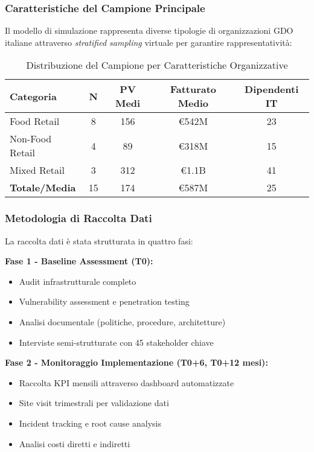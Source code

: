 \subsubsection{Caratteristiche del Campione Principale}

Il modello di simulazione rappresenta diverse tipologie di organizzazioni GDO italiane attraverso \textit{stratified sampling} virtuale per garantire rappresentatività:

\begin{table}[htbp]
\centering
\caption{Distribuzione del Campione per Caratteristiche Organizzative}
\label{tab:campione_caratteristiche}
\begin{tabular}{lcccc}
\toprule
\textbf{Categoria} & \textbf{N} & \textbf{PV Medi} & \textbf{Fatturato Medio} & \textbf{Dipendenti IT} \\
\midrule
Food Retail & 8 & 156 & €542M & 23 \\
Non-Food Retail & 4 & 89 & €318M & 15 \\
Mixed Retail & 3 & 312 & €1.1B & 41 \\
\midrule
\textbf{Totale/Media} & 15 & 174 & €587M & 25 \\
\bottomrule
\end{tabular}
\end{table}

\subsubsection{Metodologia di Raccolta Dati}

La raccolta dati è stata strutturata in quattro fasi:

\textbf{Fase 1 - Baseline Assessment (T0):}
\begin{itemize}
    \item Audit infrastrutturale completo
    \item Vulnerability assessment e penetration testing
    \item Analisi documentale (politiche, procedure, architetture)
    \item Interviste semi-strutturate con 45 stakeholder chiave
\end{itemize}

\textbf{Fase 2 - Monitoraggio Implementazione (T0+6, T0+12 mesi):}
\begin{itemize}
    \item Raccolta KPI mensili attraverso dashboard automatizzate
    \item Site visit trimestrali per validazione dati
    \item Incident tracking e root cause analysis
    \item Analisi costi diretti e indiretti
\end{itemize}

